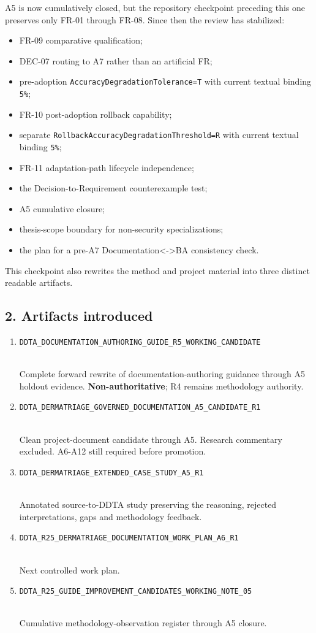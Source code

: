 \documentclass[11pt,a4paper]{article}
\providecommand{\tightlist}{\setlength{\itemsep}{0pt}\setlength{\parskip}{0pt}}
\begin{document}
A5 is now cumulatively closed, but the repository checkpoint preceding
this one preserves only FR-01 through FR-08. Since then the review has
stabilized:

\begin{itemize}
\tightlist
\item
  FR-09 comparative qualification;
\item
  DEC-07 routing to A7 rather than an artificial FR;
\item
  pre-adoption \texttt{AccuracyDegradationTolerance=T} with current
  textual binding \texttt{5\%};
\item
  FR-10 post-adoption rollback capability;
\item
  separate \texttt{RollbackAccuracyDegradationThreshold=R} with current
  textual binding \texttt{5\%};
\item
  FR-11 adaptation-path lifecycle independence;
\item
  the Decision-to-Requirement counterexample test;
\item
  A5 cumulative closure;
\item
  thesis-scope boundary for non-security specializations;
\item
  the plan for a pre-A7 Documentation\textless-\textgreater BA
  consistency check.
\end{itemize}

This checkpoint also rewrites the method and project material into three
distinct readable artifacts.

\subsection{2. Artifacts introduced}\label{2-artifacts-introduced}

\begin{enumerate}
\def\labelenumi{\arabic{enumi}.}
\item
  \texttt{DDTA\_DOCUMENTATION\_AUTHORING\_GUIDE\_R5\_WORKING\_CANDIDATE}\strut \\
  Complete forward rewrite of documentation-authoring guidance through
  A5 holdout evidence. \textbf{Non-authoritative}; R4 remains
  methodology authority.
\item
  \texttt{DDTA\_DERMATRIAGE\_GOVERNED\_DOCUMENTATION\_A5\_CANDIDATE\_R1}\strut \\
  Clean project-document candidate through A5. Research commentary
  excluded. A6-A12 still required before promotion.
\item
  \texttt{DDTA\_DERMATRIAGE\_EXTENDED\_CASE\_STUDY\_A5\_R1}\strut \\
  Annotated source-to-DDTA study preserving the reasoning, rejected
  interpretations, gaps and methodology feedback.
\item
  \texttt{DDTA\_R25\_DERMATRIAGE\_DOCUMENTATION\_WORK\_PLAN\_A6\_R1}\strut \\
  Next controlled work plan.
\item
  \texttt{DDTA\_R25\_GUIDE\_IMPROVEMENT\_CANDIDATES\_WORKING\_NOTE\_05}\strut \\
  Cumulative methodology-observation register through A5 closure.
\end{enumerate}
\end{document}
